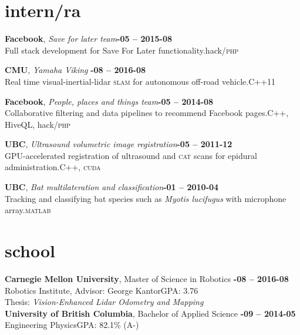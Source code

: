 \documentclass[margin,10pt]{res}
\begin{document}
\begin{resume}
\section{\sc \lsstyle intern/ra}
    \textbf{Facebook}, \textit{Save for later team}\hfill \textsc{\bfseries{}-05 -- 2015-08}\\
    Full stack development for Save For Later functionality.\hfill hack/\textsc{php}

    \textbf{CMU}, \textit{Yamaha Viking} \hfill \textsc{\bfseries{}-08 -- 2016-08}\\
    Real time visual-inertial-lidar \textsc{slam} for autonomous off-road vehicle.\hfill C++11

    \textbf{Facebook}, \textit{People, places and things team}\hfill \textsc{\bfseries{}-05 -- 2014-08}\\
    Collaborative filtering and data pipelines to recommend Facebook pages.\hfill C++, HiveQL, hack/\textsc{php}

    \textbf{UBC}, \textit{Ultrasound volumetric image registration}\hfill \textsc{\bfseries{}-05 -- 2011-12}\\
    GPU-accelerated registration of ultrasound and \textsc{cat} scans for epidural administration.\hfill C++, \textsc{cuda}

    \textbf{UBC}, \textit{Bat multilateration and classification}\hfill \textsc{\bfseries{}-01 -- 2010-04}\\
    Tracking and classifying bat species such as {\em Myotis lucifugus} with microphone array.\hfill \textsc{matlab}

\section{\sc \lsstyle school}
    \textbf{Carnegie Mellon University}, Master of Science in Robotics \hfill \textsc{\bfseries{}-08 -- 2016-08}\\
    Robotics Institute, Advisor: George Kantor\hfill GPA: 3.76\\
    Thesis: \textit{Vision-Enhanced Lidar Odometry and Mapping}\vspace{3pt}\\
    \textbf{University of British Columbia}, Bachelor of Applied Science \hfill \textsc{\bfseries{}-09 -- 2014-05}\\
    Engineering Physics\hfill GPA: 82.1\% (A-)%

\end{resume}
\end{document}
